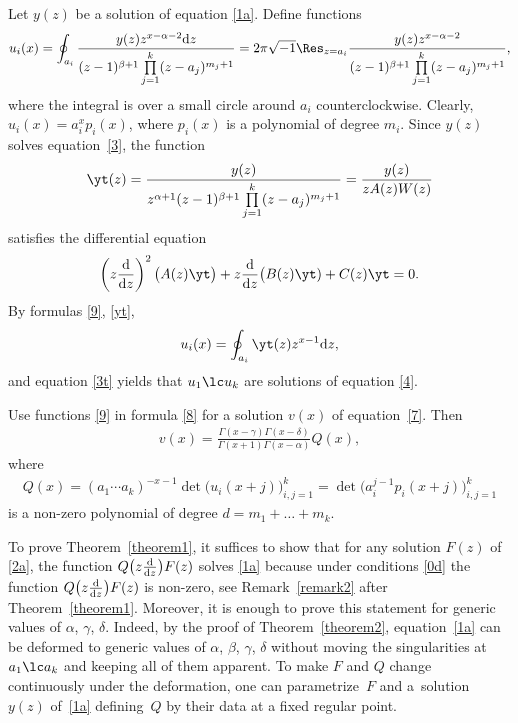 Let $y(z)$ be a solution of equation \eqref{1a}. Define functions
\begin{gather}
 u_i(x) = \oint_{a_i}\frac{y(z) z^{x-\alpha-2} {\rm d}z}
{(z-1)^{\beta+1}\prod\limits_{j=1}^k(z-a_j)^{m_j+1}}
= 2\pi\sqrt{-1} \Res_{z=a_i} \frac{y(z) z^{x-\alpha-2}}
{(z-1)^{\beta+1}\prod\limits_{j=1}^k(z-a_j)^{m_j+1}},\label{9}
\end{gather}
where the integral is over a small circle around $a_i$ counterclockwise. Clearly, $u_i(x)=a_i^xp_i(x)$, where $p_i(x)$ is a polynomial of degree $m_i$. Since $y(z)$ solves equation~\eqref{3}, the function
\begin{gather}\label{yt}
\yt(z) =
\frac{y(z)}{z^{\alpha+1}(z-1)^{\beta+1}\prod\limits_{j=1}^k(z-a_j)^{m_j+1}} =\frac{y(z)}{zA(z)W(z)}
\end{gather}
satisfies the differential equation
\begin{gather}
\left(z\frac{{\rm d}}{{\rm d}z}\right)^{ 2} \bigl( A(z) \yt\bigr)+ z\frac{{\rm d}}{{\rm d}z}\bigl(B(z) \yt)+C(z) \yt = 0.\label{3t}
\end{gather}
By formulas \eqref{9}, \eqref{yt},{\samepage
\begin{gather*}%
u_i(x)=\oint_{a_i}\yt(z) z^{x-1} {\rm d}z,
\end{gather*}
and equation \eqref{3t} yields that $u_1\lc u_k$ are solutions of equation \eqref{4}.}

Use functions \eqref{9} in formula \eqref{8} for a solution $v(x)$ of equation~\eqref{7}. Then
\begin{gather}
v(x) = \frac{\Gamma(x-\gamma) \Gamma(x-\delta)}{\Gamma(x+1) \Gamma(x-\alpha)} Q(x),\label{10}
\end{gather}
where
\begin{gather*}%
Q(x) = (a_1\cdots a_k)^{-x-1}\det\bigl(u_i(x+j)\bigr)_{i,j=1}^k=
 \det\bigl(a_i^{j-1}p_i(x+j)\bigr)_{i,j=1}^k
\end{gather*}
is a non-zero polynomial of degree $d=m_1+\dots+m_k$.

To prove Theorem~\ref{theorem1}, it suffices to show that for any solution $F(z)$ of \eqref{2a}, the function $Q\big(z\frac{{\rm d}}{{\rm d}z}\big)F(z)$ solves \eqref{1a} because under conditions \eqref{0d} the function $Q\big(z\frac{{\rm d}}{{\rm d}z}\big)F(z)$ is non-zero, see Remark~\ref{remark2} after Theorem~\ref{theorem1}. Moreover, it is enough to prove this statement for generic values of $\alpha$, $\gamma$, $\delta$. Indeed, by the proof of Theorem~\ref{theorem2}, equation~\eqref{1a} can be deformed to generic values of $\alpha$, $\beta$, $\gamma$, $\delta$ without moving the singularities at $a_1\lc a_k$ and keeping all of them apparent. To make $F$ and $Q$ change continuously under the deformation, one can parametrize~$F$ and a~solution~$y(z)$ of~\eqref{1a} defining~$Q$ by their data at a fixed regular point.

